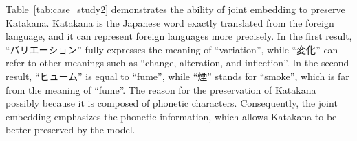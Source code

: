 \begin{CJK}{UTF8}{long}
    Table~\ref{tab:case_study2} demonstrates the ability of joint embedding to preserve Katakana. Katakana is the Japanese word exactly translated from the foreign language, and it can represent foreign languages more precisely. In the first result, ``バリエーション'' fully expresses the meaning of ``variation'', while ``変化'' can refer to other meanings such as ``change, alteration, and inflection''. In the second result, ``ヒューム'' is equal to ``fume'', while ``煙'' stands for ``smoke'', which is far from the meaning of ``fume''. The reason for the preservation of Katakana possibly because it is composed of phonetic characters. Consequently, the joint embedding emphasizes the phonetic information, which allows Katakana to be better preserved by the model.
\end{CJK}

